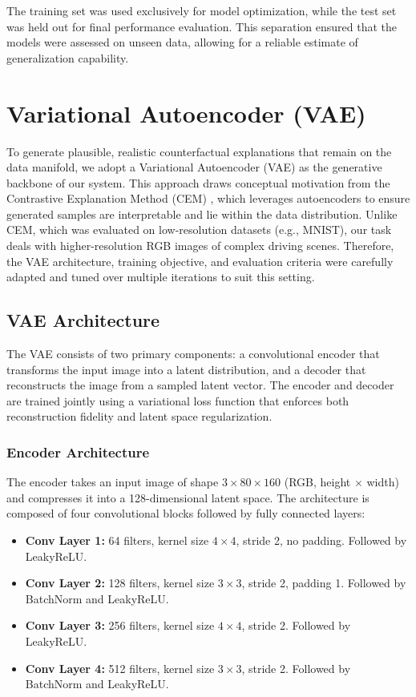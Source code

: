 The training set was used exclusively for model optimization, while the test set was held out for final performance evaluation. This separation ensured that the models were assessed on unseen data, allowing for a reliable estimate of generalization capability.



\section{Variational Autoencoder (VAE)} \label{sec:vae}

To generate plausible, realistic counterfactual explanations that remain on the data manifold, we adopt a Variational Autoencoder (VAE) as the generative backbone of our system. This approach draws conceptual motivation from the Contrastive Explanation Method (CEM) \cite{DBLP:journals/corr/abs-1802-07623}, which leverages autoencoders to ensure generated samples are interpretable and lie within the data distribution. Unlike CEM, which was evaluated on low-resolution datasets (e.g., MNIST), our task deals with higher-resolution RGB images of complex driving scenes. Therefore, the VAE architecture, training objective, and evaluation criteria were carefully adapted and tuned over multiple iterations to suit this setting.

\subsection{VAE Architecture} \label{sec:vae_architecture}

The VAE consists of two primary components: a convolutional encoder that transforms the input image into a latent distribution, and a decoder that reconstructs the image from a sampled latent vector. The encoder and decoder are trained jointly using a variational loss function that enforces both reconstruction fidelity and latent space regularization.

\subsubsection{Encoder Architecture} \label{subsubsec:vae_encoder}

The encoder takes an input image of shape $3 \times 80 \times 160$ (RGB, height $\times$ width) and compresses it into a 128-dimensional latent space. The architecture is composed of four convolutional blocks followed by fully connected layers:

\begin{itemize}
    \item \textbf{Conv Layer 1:} 64 filters, kernel size $4 \times 4$, stride 2, no padding. Followed by LeakyReLU.
    \item \textbf{Conv Layer 2:} 128 filters, kernel size $3 \times 3$, stride 2, padding 1. Followed by BatchNorm and LeakyReLU.
    \item \textbf{Conv Layer 3:} 256 filters, kernel size $4 \times 4$, stride 2. Followed by LeakyReLU.
    \item \textbf{Conv Layer 4:} 512 filters, kernel size $3 \times 3$, stride 2. Followed by BatchNorm and LeakyReLU.
\end{itemize}

